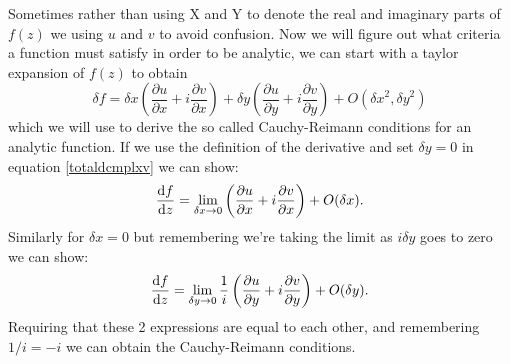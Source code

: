  Sometimes rather than using X and Y to denote the real and imaginary parts of $f(z)$ we using $u$ and $v$ to avoid confusion.
  Now we will figure out what criteria a function must satisfy in order to be analytic, we can start with a taylor expansion of $f(z)$ to obtain
 \begin{equation}
 \label{totaldcmplxv}
 \delta f=\delta x \left(\frac{\partial u}{\partial x} + i \frac{\partial v}{\partial x}\right) + \delta y \left(\frac{\partial u}{\partial y}+i\frac{\partial v}{\partial y}\right) + O\left({\delta x}^2,{\delta y}^2\right)
 \end{equation}
 which we will use to derive the so called Cauchy-Reimann conditions for an analytic function. If we use the definition of the derivative and set $\delta y=0$ in equation \ref{totaldcmplxv} we can show:
 \begin{equation*}
 \frac{\mathop{}\!\mathrm{d} f}{\mathop{}\!\mathrm{d} z}=\lim_{\delta x\to 0}\left(\frac{\partial u}{\partial x} + i \frac{\partial v}{\partial x}\right) + O(\delta x).
 \end{equation*}
Similarly for $\delta x=0$ but remembering we're taking the limit as $i\delta y$ goes to zero we can show:
\begin{equation*}
\frac{\mathop{}\!\mathrm{d} f}{\mathop{}\!\mathrm{d} z}=\lim_{\delta y\to 0}\frac{1}{i}\left(\frac{\partial u}{\partial y} + i \frac{\partial v}{\partial y}\right) + O(\delta y).
\end{equation*}
Requiring that these 2 expressions are equal to each other, and remembering $1/i=-i$ we can obtain the Cauchy-Reimann conditions. 
 
 